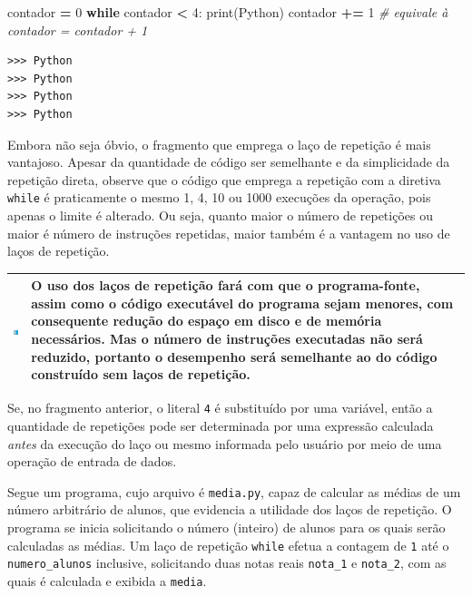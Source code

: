 \documentclass[
]{book}
\newenvironment{Shaded}{\begin{snugshade}}{\end{snugshade}}
\newcommand{\BuiltInTok}[1]{#1}
\newcommand{\CommentTok}[1]{\textcolor[rgb]{0.56,0.35,0.01}{\textit{#1}}}
\newcommand{\ControlFlowTok}[1]{\textcolor[rgb]{0.13,0.29,0.53}{\textbf{#1}}}
\newcommand{\DecValTok}[1]{\textcolor[rgb]{0.00,0.00,0.81}{#1}}
\newcommand{\NormalTok}[1]{#1}
\newcommand{\OperatorTok}[1]{\textcolor[rgb]{0.81,0.36,0.00}{\textbf{#1}}}
\newcommand{\StringTok}[1]{\textcolor[rgb]{0.31,0.60,0.02}{#1}}
\begin{document}
\begin{Shaded}
\begin{Highlighting}[]
\NormalTok{contador }\OperatorTok{=} \DecValTok{0}
\ControlFlowTok{while}\NormalTok{ contador }\OperatorTok{\textless{}} \DecValTok{4}\NormalTok{:}
    \BuiltInTok{print}\NormalTok{(}\StringTok{\textquotesingle{}Python\textquotesingle{}}\NormalTok{)}
\NormalTok{    contador }\OperatorTok{+=} \DecValTok{1} \CommentTok{\# equivale à contador = contador + 1}
\end{Highlighting}
\end{Shaded}

\begin{verbatim}
>>> Python
>>> Python
>>> Python
>>> Python
\end{verbatim}

Embora não seja óbvio, o fragmento que emprega o laço de repetição é mais vantajoso. Apesar da quantidade de código ser semelhante e da simplicidade da repetição direta, observe que o código que emprega a repetição com a diretiva \texttt{while} é praticamente o mesmo 1, 4, 10 ou 1000 execuções da operação, pois apenas o limite é alterado. Ou seja, quanto maior o número de repetições ou maior é número de instruções repetidas, maior também é a vantagem no uso de laços de repetição.

\begin{longtable}[]{@{}
  >{\centering\arraybackslash}p{}
  >{\raggedright\arraybackslash}p{}@{}}
\toprule
\includegraphics{images/info.png} & O uso dos laços de repetição fará com que o programa-fonte, assim como o código executável do programa sejam menores, com consequente redução do espaço em disco e de memória necessários. Mas o número de instruções executadas não será reduzido, portanto o desempenho será semelhante ao do código construído sem laços de repetição. \\
\midrule
\endhead
\bottomrule
\end{longtable}

Se, no fragmento anterior, o literal \texttt{4} é substituído por uma variável, então a quantidade de repetições pode ser determinada por uma expressão calculada \emph{antes} da execução do laço ou mesmo informada pelo usuário por meio de uma operação de entrada de dados.

Segue um programa, cujo arquivo é \texttt{media.py}, capaz de calcular as médias de um número arbitrário de alunos, que evidencia a utilidade dos laços de repetição. O programa se inicia solicitando o número (inteiro) de alunos para os quais serão calculadas as médias. Um laço de repetição \texttt{while} efetua a contagem de \texttt{1} até o \texttt{numero\_alunos} inclusive, solicitando duas notas reais \texttt{nota\_1} e \texttt{nota\_2}, com as quais é calculada e exibida a \texttt{media}.
\end{document}
